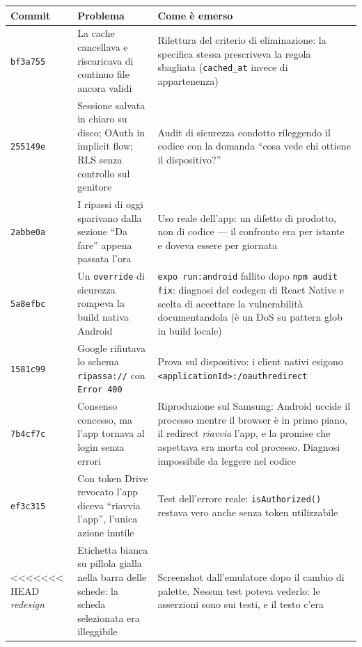 \documentclass[11pt,a4paper]{report}
\begin{document}
\begin{center}
\scriptsize
\begin{tabular}{@{}p{1.5cm}p{5.4cm}p{7.7cm}@{}}
\toprule
\textbf{Commit} & \textbf{Problema} & \textbf{Come \`e emerso} \\
\midrule
\texttt{bf3a755} & La cache cancellava e riscaricava di continuo file ancora
  validi & Rilettura del criterio di eliminazione: la specifica stessa
  prescriveva la regola sbagliata (\texttt{cached\_at} invece di appartenenza) \\
\addlinespace
\texttt{255149e} & Sessione salvata in chiaro su disco; OAuth in implicit flow;
  RLS senza controllo sul genitore & Audit di sicurezza condotto rileggendo il
  codice con la domanda ``cosa vede chi ottiene il dispositivo?'' \\
\addlinespace
\texttt{2abbe0a} & I ripassi di oggi sparivano dalla sezione ``Da fare''
  appena passata l'ora & Uso reale dell'app: un difetto di prodotto, non di
  codice --- il confronto era per istante e doveva essere per giornata \\
\addlinespace
\texttt{5a8efbc} & Un \texttt{override} di sicurezza rompeva la build nativa
  Android & \texttt{expo run:android} fallito dopo \texttt{npm audit fix}:
  diagnosi del codegen di React Native e scelta di accettare la vulnerabilit\`a
  documentandola (\`e un DoS su pattern glob in build locale) \\
\addlinespace
\texttt{1581c99} & Google rifiutava lo schema \texttt{ripassa://} con
  \texttt{Error 400} & Prova sul dispositivo: i client nativi esigono
  \texttt{<applicationId>:/oauthredirect} \\
\addlinespace
\texttt{7b4cf7c} & Consenso concesso, ma l'app tornava al login senza errori &
  Riproduzione sul Samsung: Android uccide il processo mentre il browser \`e in
  primo piano, il redirect \emph{riavvia} l'app, e la promise che aspettava era
  morta col processo. Diagnosi impossibile da leggere nel codice \\
\addlinespace
\texttt{ef3c315} & Con token Drive revocato l'app diceva ``riavvia l'app'',
  l'unica azione inutile & Test dell'errore reale: \texttt{isAuthorized()}
  restava vero anche senza token utilizzabile \\
\addlinespace
<<<<<<< HEAD
\emph{redesign} & Etichetta bianca su pillola gialla nella barra delle schede:
  la scheda selezionata era illeggibile & Screenshot dall'emulatore dopo il
  cambio di palette. Nessun test poteva vederlo: le asserzioni sono sui testi,
  e il testo c'era \\

\end{tabular}
\end{center}
\end{document}
